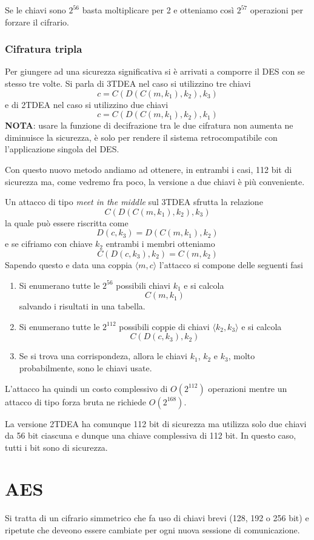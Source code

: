 Se le chiavi sono $2^{56}$ basta moltiplicare per 2 e otteniamo cos\`i $2^{57}$ operazioni per forzare il cifrario.

\subsubsection{Cifratura tripla}
Per giungere ad una sicurezza significativa si \`e arrivati a comporre il DES con se stesso tre volte. Si parla di 3TDEA
nel caso si utilizzino tre chiavi
\[ c = C(D(C(m, k_1), k_2), k_3) \]
e di 2TDEA nel caso si utilizzino due chiavi
\[ c = C(D(C(m, k_1), k_2), k_1) \]
\textbf{NOTA}: usare la funzione di decifrazione tra le due cifratura non aumenta ne diminuisce la sicurezza, \`e solo per
rendere il sistema retrocompatibile con l'applicazione singola del DES.

Con questo nuovo metodo andiamo ad ottenere, in entrambi i casi, 112 bit di sicurezza ma, come vedremo fra poco, la
versione a due chiavi \`e pi\`u conveniente.

Un attacco di tipo \emph{meet in the middle} sul 3TDEA sfrutta la relazione
\[ C(D(C(m, k_1), k_2), k_3) \]
la quale pu\`o essere riscritta come
\[ D(c, k_3) = D(C(m, k_1), k_2) \]
e se cifriamo con chiave $k_2$ entrambi i membri otteniamo
\[ C(D(c, k_3), k_2) = C(m, k_2) \]
Sapendo questo e data una coppia $\langle m, c \rangle$ l'attacco si compone delle seguenti fasi
\begin{enumerate}
	\item Si enumerano tutte le $2^{56}$ possibili chiavi $k_1$ e si calcola
	      \[ C(m, k_1) \]
	      salvando i risultati in una tabella.
	\item Si enumerano tutte le $2^{112}$ possibili coppie di chiavi $\langle k_2, k_3 \rangle$ e si calcola
	      \[ C(D(c, k_3), k_2) \]
	\item Se si trova una corrispondeza, allora le chiavi $k_1$, $k_2$ e $k_3$, molto probabilmente, sono le chiavi
	      usate.
\end{enumerate}
L'attacco ha quindi un costo complessivo di $O(2^{112})$ operazioni mentre un attacco di tipo forza bruta ne richiede
$O(2^{168})$.

La versione 2TDEA ha comunque 112 bit di sicurezza ma utilizza solo due chiavi da 56 bit ciascuna e dunque una chiave
complessiva di 112 bit. In questo caso, tutti i bit sono di sicurezza.

\section{AES}\label{AES}
Si tratta di un cifrario simmetrico che fa uso di chiavi brevi (128, 192 o 256 bit) e ripetute che deveono essere
cambiate per ogni nuova sessione di comunicazione.

